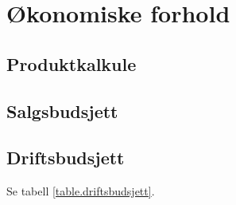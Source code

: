 \section{Økonomiske forhold}

\subsection{Produktkalkule}

\subsection{Salgsbudsjett}

\subsection{Driftsbudsjett}

Se tabell \vref{table.driftsbudsjett}.

